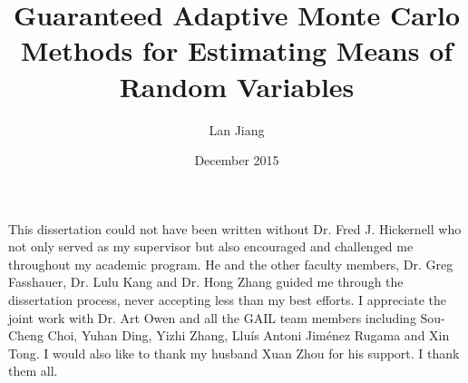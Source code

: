 \documentclass{iitthesis}
\theoremstyle{definition}
\begin{document}

\title{Guaranteed Adaptive Monte Carlo Methods for Estimating Means of Random Variables}
\author{Lan Jiang}
 
\date{December 2015}
\maketitle                %


\prelimpages         %


\begin{acknowledgement}     %
\par  This dissertation could not have been written without Dr. Fred
J. Hickernell who not only served as my supervisor but also encouraged and challenged me throughout my academic program. He and the other faculty members, Dr. Greg Fasshauer, Dr. Lulu Kang and Dr. Hong Zhang guided me through the dissertation process, never accepting less than my best efforts. I appreciate the joint work with Dr. Art Owen and all the GAIL team members including Sou-Cheng Choi, Yuhan Ding, Yizhi Zhang, Llu{\'i}s Antoni Jim{\'e}nez Rugama and Xin Tong. I would also like to thank my husband Xuan Zhou for his support. I thank them all. 
\end{acknowledgement}


\tableofcontents
 \clearpage

\listoftables

\clearpage

\listoffigures

\clearpage
\end{document}
